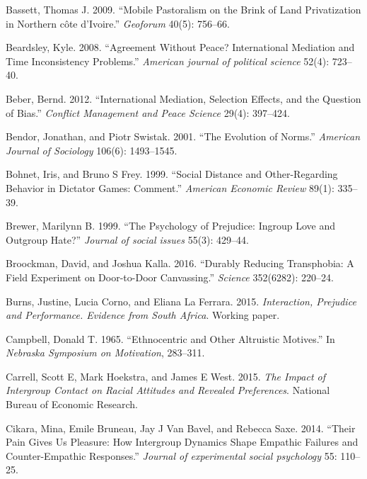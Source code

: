 \documentclass[11pt]{article}
\begin{document}
\leavevmode\hypertarget{ref-bassett2009mobile}{}%
Bassett, Thomas J. 2009. ``Mobile Pastoralism on the Brink of Land
Privatization in Northern côte d'Ivoire.'' \emph{Geoforum} 40(5):
756--66.

\leavevmode\hypertarget{ref-beardsley2008agreement}{}%
Beardsley, Kyle. 2008. ``Agreement Without Peace? International
Mediation and Time Inconsistency Problems.'' \emph{American journal of
political science} 52(4): 723--40.

\leavevmode\hypertarget{ref-beber2012international}{}%
Beber, Bernd. 2012. ``International Mediation, Selection Effects, and
the Question of Bias.'' \emph{Conflict Management and Peace Science}
29(4): 397--424.

\leavevmode\hypertarget{ref-bendor2001evolution}{}%
Bendor, Jonathan, and Piotr Swistak. 2001. ``The Evolution of Norms.''
\emph{American Journal of Sociology} 106(6): 1493--1545.

\leavevmode\hypertarget{ref-bohnet1999social}{}%
Bohnet, Iris, and Bruno S Frey. 1999. ``Social Distance and
Other-Regarding Behavior in Dictator Games: Comment.'' \emph{American
Economic Review} 89(1): 335--39.

\leavevmode\hypertarget{ref-brewer1999ingroupOutgroup}{}%
Brewer, Marilynn B. 1999. ``The Psychology of Prejudice: Ingroup Love
and Outgroup Hate?'' \emph{Journal of social issues} 55(3): 429--44.

\leavevmode\hypertarget{ref-broockman2016durably}{}%
Broockman, David, and Joshua Kalla. 2016. ``Durably Reducing
Transphobia: A Field Experiment on Door-to-Door Canvassing.''
\emph{Science} 352(6282): 220--24.

\leavevmode\hypertarget{ref-burns2015interaction}{}%
Burns, Justine, Lucia Corno, and Eliana La Ferrara. 2015.
\emph{Interaction, Prejudice and Performance. Evidence from South
Africa}. Working paper.

\leavevmode\hypertarget{ref-campbell1965ethno}{}%
Campbell, Donald T. 1965. ``Ethnocentric and Other Altruistic Motives.''
In \emph{Nebraska Symposium on Motivation}, 283--311.

\leavevmode\hypertarget{ref-carrell2015impact}{}%
Carrell, Scott E, Mark Hoekstra, and James E West. 2015. \emph{The
Impact of Intergroup Contact on Racial Attitudes and Revealed
Preferences}. National Bureau of Economic Research.

\leavevmode\hypertarget{ref-cikara2014their}{}%
Cikara, Mina, Emile Bruneau, Jay J Van Bavel, and Rebecca Saxe. 2014.
``Their Pain Gives Us Pleasure: How Intergroup Dynamics Shape Empathic
Failures and Counter-Empathic Responses.'' \emph{Journal of experimental
social psychology} 55: 110--25.
\end{document}
